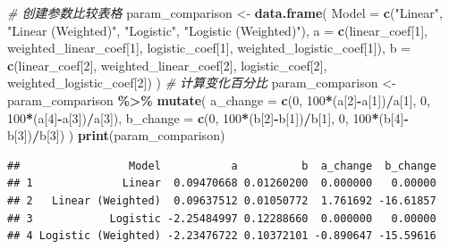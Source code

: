 \documentclass[
]{article}
\newenvironment{Shaded}{\begin{snugshade}}{\end{snugshade}}
\newcommand{\AttributeTok}[1]{\textcolor[rgb]{0.13,0.29,0.53}{#1}}
\newcommand{\CommentTok}[1]{\textcolor[rgb]{0.56,0.35,0.01}{\textit{#1}}}
\newcommand{\DecValTok}[1]{\textcolor[rgb]{0.00,0.00,0.81}{#1}}
\newcommand{\FunctionTok}[1]{\textcolor[rgb]{0.13,0.29,0.53}{\textbf{#1}}}
\newcommand{\NormalTok}[1]{#1}
\newcommand{\OtherTok}[1]{\textcolor[rgb]{0.56,0.35,0.01}{#1}}
\newcommand{\SpecialCharTok}[1]{\textcolor[rgb]{0.81,0.36,0.00}{\textbf{#1}}}
\newcommand{\StringTok}[1]{\textcolor[rgb]{0.31,0.60,0.02}{#1}}
\begin{document}
\begin{Shaded}
\begin{Highlighting}[]
\CommentTok{\# 创建参数比较表格}
\NormalTok{param\_comparison }\OtherTok{\textless{}{-}} \FunctionTok{data.frame}\NormalTok{(}
\AttributeTok{Model =} \FunctionTok{c}\NormalTok{(}\StringTok{"Linear"}\NormalTok{, }\StringTok{"Linear (Weighted)"}\NormalTok{, }\StringTok{"Logistic"}\NormalTok{, }\StringTok{"Logistic (Weighted)"}\NormalTok{),}
\AttributeTok{a =} \FunctionTok{c}\NormalTok{(linear\_coef[}\DecValTok{1}\NormalTok{], weighted\_linear\_coef[}\DecValTok{1}\NormalTok{],}
\NormalTok{logistic\_coef[}\DecValTok{1}\NormalTok{], weighted\_logistic\_coef[}\DecValTok{1}\NormalTok{]),}
\AttributeTok{b =} \FunctionTok{c}\NormalTok{(linear\_coef[}\DecValTok{2}\NormalTok{], weighted\_linear\_coef[}\DecValTok{2}\NormalTok{],}
\NormalTok{logistic\_coef[}\DecValTok{2}\NormalTok{], weighted\_logistic\_coef[}\DecValTok{2}\NormalTok{])}
\NormalTok{)}
\CommentTok{\# 计算变化百分比}
\NormalTok{param\_comparison }\OtherTok{\textless{}{-}}\NormalTok{ param\_comparison }\SpecialCharTok{\%\textgreater{}\%}
\FunctionTok{mutate}\NormalTok{(}
\AttributeTok{a\_change =} \FunctionTok{c}\NormalTok{(}\DecValTok{0}\NormalTok{, }\DecValTok{100}\SpecialCharTok{*}\NormalTok{(a[}\DecValTok{2}\NormalTok{]}\SpecialCharTok{{-}}\NormalTok{a[}\DecValTok{1}\NormalTok{])}\SpecialCharTok{/}\NormalTok{a[}\DecValTok{1}\NormalTok{], }\DecValTok{0}\NormalTok{, }\DecValTok{100}\SpecialCharTok{*}\NormalTok{(a[}\DecValTok{4}\NormalTok{]}\SpecialCharTok{{-}}\NormalTok{a[}\DecValTok{3}\NormalTok{])}\SpecialCharTok{/}\NormalTok{a[}\DecValTok{3}\NormalTok{]),}
\AttributeTok{b\_change =} \FunctionTok{c}\NormalTok{(}\DecValTok{0}\NormalTok{, }\DecValTok{100}\SpecialCharTok{*}\NormalTok{(b[}\DecValTok{2}\NormalTok{]}\SpecialCharTok{{-}}\NormalTok{b[}\DecValTok{1}\NormalTok{])}\SpecialCharTok{/}\NormalTok{b[}\DecValTok{1}\NormalTok{], }\DecValTok{0}\NormalTok{, }\DecValTok{100}\SpecialCharTok{*}\NormalTok{(b[}\DecValTok{4}\NormalTok{]}\SpecialCharTok{{-}}\NormalTok{b[}\DecValTok{3}\NormalTok{])}\SpecialCharTok{/}\NormalTok{b[}\DecValTok{3}\NormalTok{])}
\NormalTok{)}
\FunctionTok{print}\NormalTok{(param\_comparison)}
\end{Highlighting}
\end{Shaded}

\begin{verbatim}
##                 Model           a          b  a_change  b_change
## 1              Linear  0.09470668 0.01260200  0.000000   0.00000
## 2   Linear (Weighted)  0.09637512 0.01050772  1.761692 -16.61857
## 3            Logistic -2.25484997 0.12288660  0.000000   0.00000
## 4 Logistic (Weighted) -2.23476722 0.10372101 -0.890647 -15.59616
\end{verbatim}
\end{document}
